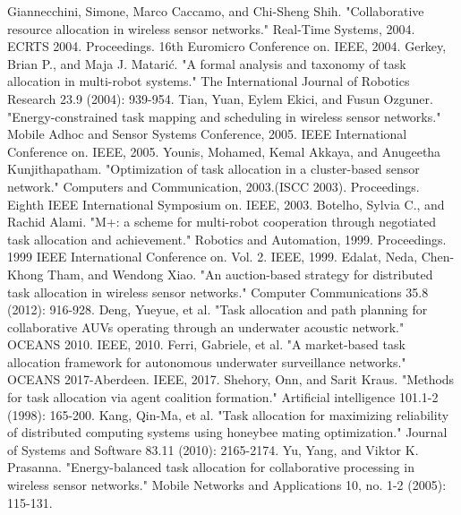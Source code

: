 \documentclass[conference]{IEEEtran}
\begin{document}


\begin{thebibliography}{1}
\bibitem{}
Giannecchini, Simone, Marco Caccamo, and Chi-Sheng Shih. "Collaborative resource allocation in wireless sensor networks." Real-Time Systems, 2004. ECRTS 2004. Proceedings. 16th Euromicro Conference on. IEEE, 2004.
\bibitem{}
Gerkey, Brian P., and Maja J. Matarić. "A formal analysis and taxonomy of task allocation in multi-robot systems." The International Journal of Robotics Research 23.9 (2004): 939-954.
\bibitem{}
Tian, Yuan, Eylem Ekici, and Fusun Ozguner. "Energy-constrained task mapping and scheduling in wireless sensor networks." Mobile Adhoc and Sensor Systems Conference, 2005. IEEE International Conference on. IEEE, 2005.
\bibitem{}
Younis, Mohamed, Kemal Akkaya, and Anugeetha Kunjithapatham. "Optimization of task allocation in a cluster-based sensor network." Computers and Communication, 2003.(ISCC 2003). Proceedings. Eighth IEEE International Symposium on. IEEE, 2003.
\bibitem{}
Botelho, Sylvia C., and Rachid Alami. "M+: a scheme for multi-robot cooperation through negotiated task allocation and achievement." Robotics and Automation, 1999. Proceedings. 1999 IEEE International Conference on. Vol. 2. IEEE, 1999.
\bibitem{}
Edalat, Neda, Chen-Khong Tham, and Wendong Xiao. "An auction-based strategy for distributed task allocation in wireless sensor networks." Computer Communications 35.8 (2012): 916-928.
\bibitem{}
Deng, Yueyue, et al. "Task allocation and path planning for collaborative AUVs operating through an underwater acoustic network." OCEANS 2010. IEEE, 2010.
\bibitem{}
Ferri, Gabriele, et al. "A market-based task allocation framework for autonomous underwater surveillance networks." OCEANS 2017-Aberdeen. IEEE, 2017.
\bibitem{}
Shehory, Onn, and Sarit Kraus. "Methods for task allocation via agent coalition formation." Artificial intelligence 101.1-2 (1998): 165-200.
\bibitem{}
Kang, Qin-Ma, et al. "Task allocation for maximizing reliability of distributed computing systems using honeybee mating optimization." Journal of Systems and Software 83.11 (2010): 2165-2174.
\bibitem{}
Yu, Yang, and Viktor K. Prasanna. "Energy-balanced task allocation for collaborative processing in wireless sensor networks." Mobile Networks and Applications 10, no. 1-2 (2005): 115-131.
\end{thebibliography}
\end{document}
